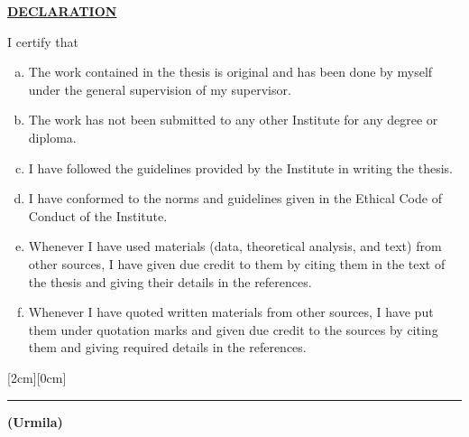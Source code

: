 \thispagestyle{empty}

\begin{center}
\bf{\underline{DECLARATION}}
\end{center}
\vspace*{0.5cm}
\begin{flushright}
\end{flushright}

\begin{flushleft}
I certify that 
\end{flushleft}
\begin{enumerate}[a.]
\item The work contained in the thesis is original and has been done by myself under the general supervision of my supervisor.
\item The work has not been submitted to any other Institute for any degree or diploma.
\item I have followed the guidelines provided by the Institute in writing the thesis.
\item I have conformed to the norms and guidelines given in the Ethical Code of Conduct of the Institute.
\item Whenever I have used materials (data, theoretical analysis, and text) from other sources, I have given due credit to them by citing them in the text of the thesis and giving their details in the references.
\item Whenever I have quoted written materials from other sources, I have put them under quotation marks and given due credit to the sources by citing them and giving required details in the references.
\end{enumerate}

\vspace*{1.5cm}
\begin{flushright}
\raisebox{0.1cm}[2cm][0cm]{
\begin{minipage}{4cm}
\rule{\textwidth}{0.5pt}
\begin{flushright}
{\bf  (Urmila)}
\end{flushright}
\end{minipage}
}
\end{flushright}


